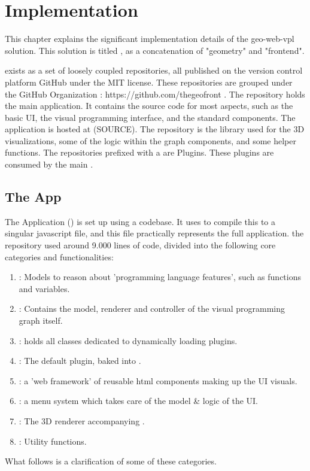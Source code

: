 \chapter{Implementation}%
\label{chap:implementation}

This chapter explains the significant implementation details of the geo-web-vpl solution.
This solution is titled \geofront{}, as a concatenation of "geometry" and "frontend".

\geofront{} exists as a set of loosely coupled repositories, all published on the version control platform GitHub under the MIT license. These repositories are grouped under the GitHub Organization  : https://github.com/thegeofront .
The  repository holds the main \geofront{} application. It contains the source code for most aspects, such as the basic UI, the visual programming interface, and the standard components. The application is hosted at (SOURCE).
The  repository is the library used for the 3D visualizations, some of the logic within the graph components, and some helper functions.
The repositories prefixed with a  are \geofront{} Plugins. These plugins are consumed by the main .


\section{The App}
The \geofront{} Application () is set up using a  codebase. It uses  to compile this to a singular javascript file, and this file practically represents the full application. 
the repository used around 9.000 lines of code, divided into the following core categories and functionalities:
\begin{enumerate}[I]
  \item {}: Models to reason about 'programming language features', such as functions and variables.
  \item {}: Contains the model, renderer and controller of the visual programming graph itself.  
  \item {}: holds all classes dedicated to dynamically loading plugins.
  \item {}: The default plugin, baked into \geofront{}.   
  \item {}: a 'web framework' of reusable html components making up the UI visuals.
  \item {}: a menu system which takes care of the model \& logic of the UI.
  \item {}: The 3D renderer accompanying \geofront{}.
  \item {}: Utility functions.   
\end{enumerate}
What follows is a clarification of some of these categories.

